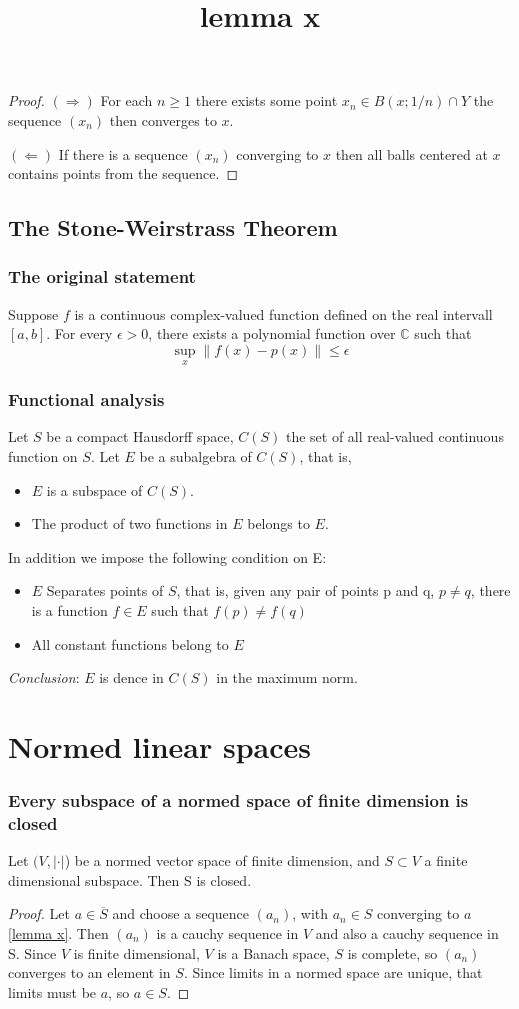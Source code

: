 \documentclass[titlepage]{article}
\begin{document}
\begin{proof}
\title{lemma x}
$(\Rightarrow)$ For each $n\geq 1$ there exists some point $x_n \in B(x;1/n)\cap Y$ the sequence $(x_n)$ then converges to $x$.

$(\Leftarrow)$  If there is a sequence $(x_n)$ converging to $x$ then all balls centered at $x$ contains points from the sequence.
\end{proof}
\subsection{The Stone-Weirstrass Theorem}
\subsubsection{The original statement}
Suppose $f$ is a continuous complex-valued function defined on the real intervall $[a,b]$. For every $\epsilon>0$, there exists a polynomial function over $\mathbb{C}$ such that 
\begin{equation}
\sup_x\| f(x) - p(x)\| \leq \epsilon
\end{equation}
\subsubsection{Functional analysis}
Let $S$ be a compact Hausdorff space, $C(S)$ the set of all real-valued continuous function on $S$. Let $E$ be a subalgebra of $C(S)$, that is,
\begin{itemize}
\item $E$ is a subspace of $C(S)$.
\item The product of two functions in $E$ belongs to $E$.
\end{itemize}
In addition we impose the following condition on E:
\begin{itemize}
\item $E$ Separates points of $S$, that is, given any pair of points p and q, $p\neq q$, there is a function $f\in E$ such that $f(p) \neq f(q)$
\item All constant functions belong to $E$
\end{itemize}
\textit{Conclusion}: $E$ is dence in $C(S)$ in the maximum norm.

\newpage
\section{Normed linear spaces}
\subsubsection{Every subspace of a normed space of finite dimension is closed}
Let $(V, |\cdot|$) be a normed vector space of finite dimension, and $S\subset V$ a finite dimensional subspace. Then S is closed.
\begin{proof}
Let $a\in \overline{S}$ and choose a sequence $(a_n)$, with $a_n \in S$ converging to $a$ \ref{lemma x}. Then $(a_n)$ is a cauchy sequence in $V$ and also a cauchy sequence in S. Since $V$ is finite dimensional, $V$ is a Banach space, $S$ is complete, so $(a_n)$ converges to an element in $S$. Since limits in a normed space are unique, that limits must be $a$, so $a\in S$.
\end{proof}
\end{document}
